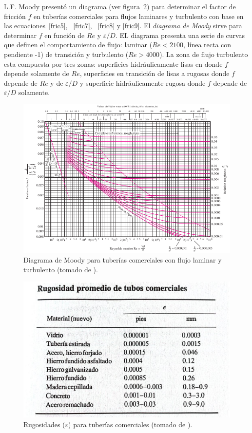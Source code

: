 \documentclass[11pt, oneside]{article}
\begin{document}
L.F. Moody present\'o un diagrama (ver figura~\ref{mood}) para determinar el factor de fricci\'on $f$ en tuber\'ias comerciales para flujos laminares y turbulento con base en las ecuaciones~\ref{fric5}, ~\ref{fric7}, ~\ref{fric8} y \ref{fric9}. El \emph{diagrama de Moody} sirve para determinar $f$ en funci\'on de $Re$ y $\varepsilon/D$. EL diagrama presenta una serie de curvas que definen el comportamiento de flujo: laminar ($Re<2100$, l\'inea recta con pendiente -1) de transici\'on y turbulento ($Re>4000$).  La zona de flujo turbulento esta compuesta por tres zonas: superficies hidr\'aulicamente lisas en donde $f$ depende solamente de $Re$, superficies en transici\'on de lisas a rugosas donde $f$ depende de $Re$ y de $\varepsilon/D$ y superficie hidr\'aulicamente rugosa donde $f$ depende de $\varepsilon/D$ solamente. 

\begin{figure}[h]
\centering
\includegraphics[width=\textwidth]{mood.png}
\caption{Diagrama de Moody para tuber\'ias comerciales con flujo laminar y turbulento (tomado de \cite{white1990fluid1990fluid}).}
\label{mood}
\end{figure}

\begin{figure}[h]
\centering
\includegraphics[width=\textwidth]{rugo.jpeg}
\caption{Rugosidades ($\varepsilon$) para tuber\'ias comerciales (tomado de \cite{white1990fluid1990fluid}).}
\label{mood}
\end{figure}
\end{document}
